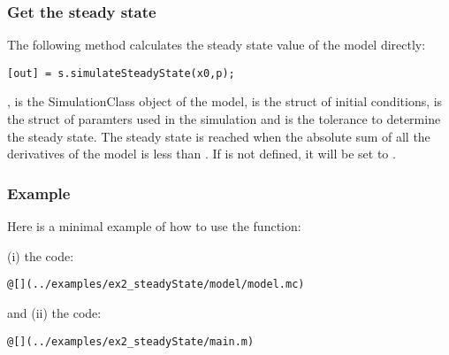 \documentclass[11pt]{article}
\begin{document}
\subsubsection{Get the steady state}

The following method calculates the steady state value of the model directly:

\begin{lstlisting}
[out] = s.simulateSteadyState(x0,p);
\end{lstlisting}

,  is the SimulationClass object of the model,  is the struct of initial conditions,  is the struct of paramters used in the simulation and  is the tolerance to determine the steady state. The steady state is reached when the absolute sum of all the derivatives of the model is less than . If  is not defined, it will be set to .

\subsubsection{Example}

Here is a minimal example of how to use the  function:

(i) the  code:

\begin{lstlisting}
@[](../examples/ex2_steadyState/model/model.mc)
\end{lstlisting}

and (ii) the  code:

\begin{lstlisting}
@[](../examples/ex2_steadyState/main.m)
\end{lstlisting}
\end{document}
